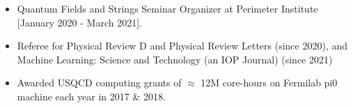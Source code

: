 \renewcommand{\arraystretch}{1.1}

	\begin{itemize}
	 \item Quantum Fields and Strings Seminar Organizer at Perimeter Institute [January 2020 - March 2021].
	  \item Referee for Physical Review D and Physical Review Letters (since 2020), and Machine Learning: Science and Technology (an IOP Journal) (since 2021)
	  \item Awarded USQCD computing grants of $\approx$ 12M core-hours on Fermilab pi0 machine each year in 2017 \& 2018. 
	  \end{itemize}
